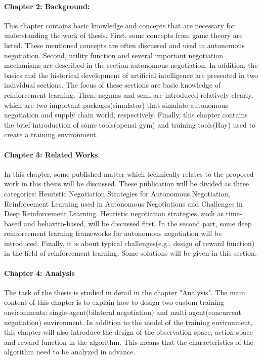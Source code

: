 \paragraph{Chapter 2: Background:}
This chapter contains basic knowledge and concepts that are necessary for understanding the work of thesis. First, some concepts from game theory are listed. These mentioned concepts are often discussed and used in autonomous negotiation. Second, utility function and several important negotiation mechanisms are described in the section autonomous negotiation. In addition, the basics and the historical development of artificial intelligence are presented in two individual sections. The focus of these sections are basic knowledge of reinforcement learning. Then, \gls{negmas} and \gls{scml} are introduced relatively clearly, which are two important packages(simulator) that simulate autonomous negotiation and supply chain world, respectively. Finally, this chapter contains the brief introduction of some tools(\gls{openai gym}) and training tools(Ray) used to create a training environment.

\paragraph{Chapter 3: Related Works}
In this chapter, some published matter which technically relates to the proposed work in this thesis will be discussed. These publication will be divided as three categories: Heuristic Negotiation Strategies for Autonomous Negotiation, Reinforcement Learning used in Autonomous Negotiations and Challenges in Deep Reinforcement Learning. Heuristic negotiation strategies, such as time-based and behaviro-based, will be discussed first. In the second part, some deep reinforcement learning frameworks for autonomous negotiation will be introduced. Finally, it is about typical challenges(e.g., design of reward function) in the field of reinforcement learning. Some solutions will be given in this section.

\paragraph{Chapter 4: Analysis}
The task of the thesis is studied in detail in the chapter "Analysis". The main content of this chapter is to explain how to design two custom training environments: single-agent(bilateral negotiation) and multi-agent(concurrent negotiation) environment. In addition to the model of the training environment, this chapter will also introduce the design of the observation space, action space and reward function in the algorithm.
This means that the characteristics of the algorithm need to be analyzed in advance.


